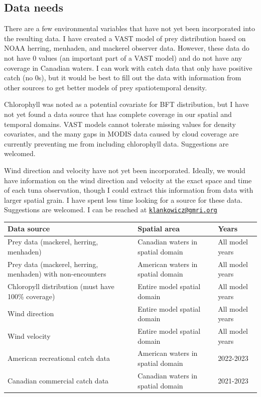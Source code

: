 \documentclass[
]{article}
\let\origtable\table
\let\endorigtable\endtable
\renewenvironment{table}[1][2] {
    \expandafter\origtable\expandafter[H]
} {
    \endorigtable
}
\begin{document}
\hypertarget{data-needs}{%
\subsection{Data needs}\label{data-needs}}

There are a few environmental variables that have not yet been incorporated into the resulting data. I have created a VAST model of prey distribution based on NOAA herring, menhaden, and mackerel observer data. However, these data do not have 0 values (an important part of a VAST model) and do not have any coverage in Canadian waters. I can work with catch data that only have positive catch (no 0s), but it would be best to fill out the data with information from other sources to get better models of prey spatiotemporal density.

Chlorophyll was noted as a potential covariate for BFT distribution, but I have not yet found a data source that has complete coverage in our spatial and temporal domains. VAST models cannot tolerate missing values for density covariates, and the many gaps in MODIS data caused by cloud coverage are currently preventing me from including chlorophyll data. Suggestions are welcomed.

Wind direction and velocity have not yet been incorporated. Ideally, we would have information on the wind direction and velocity at the exact space and time of each tuna observation, though I could extract this information from data with larger spatial grain. I have spent less time looking for a source for these data. Suggestions are welcomed. I can be reached at \href{mailto:klankowicz@gmri.org}{\nolinkurl{klankowicz@gmri.org}}

\begin{table}[H]

\caption{\label{tab:dataneeds-table}Data needs}
\centering
\begin{tabular}[t]{lll}
\toprule
Data source & Spatial area & Years\\
\midrule
Prey data (mackerel, herring, menhaden) & Canadian waters in spatial domain & All model years\\
Prey data (mackerel, herring, menhaden) with non-encounters & American waters in spatial domain & All model years\\
Chloropyll distribution (must have 100\% coverage) & Entire model spatial domain & All model years\\
Wind direction & Entire model spatial domain & All model years\\
Wind velocity & Entire model spatial domain & All model years\\
\addlinespace
American recreational catch data & American waters in spatial domain & 2022-2023\\
Canadian commercial catch data & Canadian waters in spatial domain & 2021-2023\\
\bottomrule
\end{tabular}
\end{table}
\end{document}
